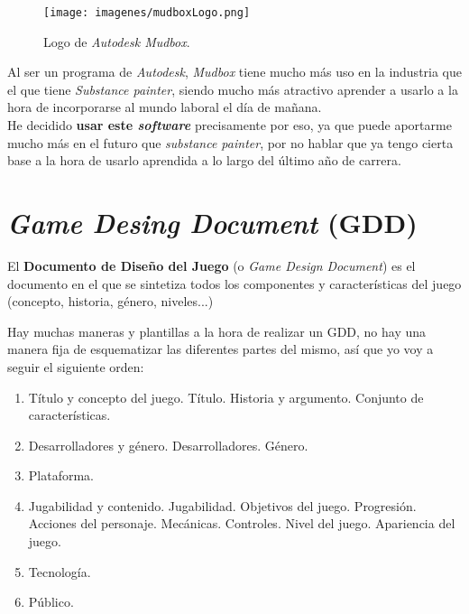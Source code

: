 \begin{wrapfigure}{r}{0.6\textwidth}
	\vspace{-30pt}
	\begin{center}
		\vspace{-10pt}
		\texttt{[image: imagenes/mudboxLogo.png]}
		\caption{Logo de \textit{Autodesk Mudbox}.}
		\vspace{-10pt}
	\end{center}
	\vspace{-30pt}
\end{wrapfigure}

Al ser un programa de \textit{Autodesk}, \textit{Mudbox} tiene mucho más uso en la industria que el que tiene \textit{Substance painter}, siendo mucho más atractivo aprender a usarlo a la hora de incorporarse al mundo laboral el día de mañana.
\\

He decidido \textbf{usar este \textit{software}} precisamente por eso, ya que puede aportarme mucho más en el futuro que \textit{substance painter}, por no hablar que ya tengo cierta base a la hora de usarlo aprendida a lo largo del último año de carrera.
\\


\section{\textit{Game Desing Document} (GDD)}
	
El\textbf{ Documento de Diseño del Juego} (o \textit{Game Design Document}) es el documento en el que se sintetiza todos los componentes y características del juego (concepto, historia, género, niveles...)

Hay muchas maneras y plantillas a la hora de realizar un GDD, no hay una manera fija de esquematizar las diferentes partes del mismo, así que yo voy a seguir el siguiente orden:

\begin{enumerate}
	\item Título y concepto del juego.
		\subitem Título.
		\subitem Historia y argumento.
		\subitem Conjunto de características.
	\item Desarrolladores y género.
		\subitem Desarrolladores.
		\subitem Género.
	\item Plataforma.
	\item Jugabilidad y contenido.
		\subitem Jugabilidad.
		\subitem Objetivos del juego.
		\subitem Progresión.
		\subitem Acciones del personaje.
		\subitem Mecánicas.
		\subitem Controles.
		\subitem Nivel del juego.
		\subitem Apariencia del juego.
	\item Tecnología.
	\item Público.
\end{enumerate}

